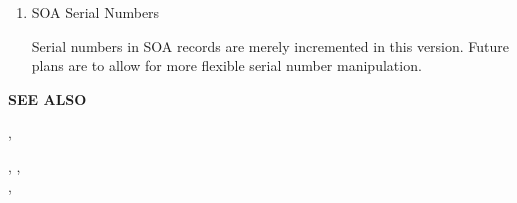 \begin{enumerate}

\item SOA Serial Numbers\verb" "

Serial numbers in SOA records are merely incremented in this version.  Future
plans are to allow for more flexible serial number manipulation.

\end{enumerate}

{\bf SEE ALSO}

,

,
,	\\
,

